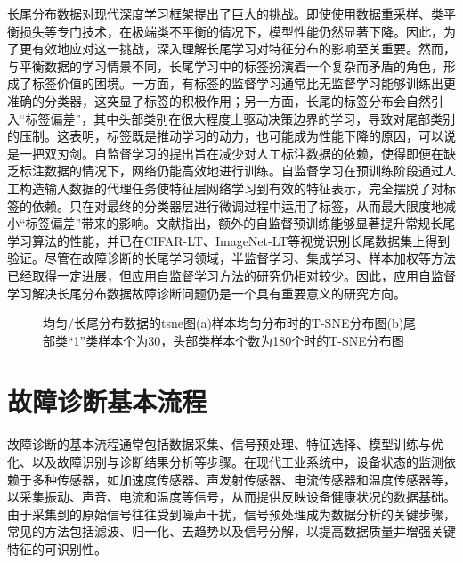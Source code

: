 \documentclass[master]{thesis-uestc}
\begin{document}
长尾分布数据对现代深度学习框架提出了巨大的挑战。即使使用数据重采样、类平衡损失等专门技术，在极端类不平衡的情况下，模型性能仍然显著下降。因此，为了更有效地应对这一挑战，深入理解长尾学习对特征分布的影响至关重要。然而，与平衡数据的学习情景不同，长尾学习中的标签扮演着一个复杂而矛盾的角色，形成了标签价值的困境。一方面，有标签的监督学习通常比无监督学习能够训练出更准确的分类器，这突显了标签的积极作用；另一方面，长尾的标签分布会自然引入“标签偏差”，其中头部类别在很大程度上驱动决策边界的学习，导致对尾部类别的压制。这表明，标签既是推动学习的动力，也可能成为性能下降的原因，可以说是一把双刃剑。自监督学习的提出旨在减少对人工标注数据的依赖，使得即便在缺乏标注数据的情况下，网络仍能高效地进行训练。自监督学习在预训练阶段通过人工构造输入数据的代理任务使特征层网络学习到有效的特征表示，完全摆脱了对标签的依赖。只在对最终的分类器层进行微调过程中运用了标签，从而最大限度地减小“标签偏差”带来的影响。文献\cite{zhang2021federated}指出，额外的自监督预训练能够显著提升常规长尾学习算法的性能，并已在CIFAR-LT、ImageNet-LT等视觉识别长尾数据集上得到验证。尽管在故障诊断的长尾学习领域，半监督学习、集成学习、样本加权等方法已经取得一定进展，但应用自监督学习方法的研究仍相对较少。因此，应用自监督学习解决长尾分布数据故障诊断问题仍是一个具有重要意义的研究方向。
\begin{figure}[h]
    \caption{均匀/长尾分布数据的tsne图(a)样本均匀分布时的T-SNE分布图(b)尾部类“1”类样本个为30，头部类样本个数为180个时的T-SNE分布图}
    \label{long-tail result}
\end{figure}

\FloatBarrier  %
\section{故障诊断基本流程}
故障诊断的基本流程通常包括数据采集、信号预处理、特征选择、模型训练与优化、以及故障识别与诊断结果分析等步骤。在现代工业系统中，设备状态的监测依赖于多种传感器，如加速度传感器、声发射传感器、电流传感器和温度传感器等，以采集振动、声音、电流和温度等信号，从而提供反映设备健康状况的数据基础。由于采集到的原始信号往往受到噪声干扰，信号预处理成为数据分析的关键步骤，常见的方法包括滤波、归一化、去趋势以及信号分解，以提高数据质量并增强关键特征的可识别性。
\end{document}
